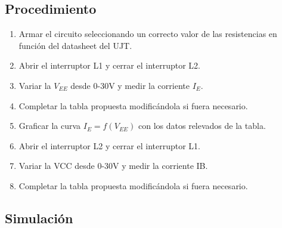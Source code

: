 \subsection{Procedimiento}
\begin{enumerate}
  \item Armar el circuito seleccionando un correcto valor de las resistencias en
    función del datasheet del UJT.
  \item Abrir el interruptor L1 y cerrar el interruptor L2.
  \item Variar la $V_{EE}$ desde 0-30V y medir la corriente $I_E$.
  \item Completar la tabla propuesta modificándola si fuera necesario.
  \item Graficar la curva $I_E= f(V_{EE})$ con los datos relevados de la tabla.
  \item Abrir el interruptor L2 y cerrar el interruptor L1.
  \item Variar la VCC desde 0-30V y medir la corriente IB.
  \item Completar la tabla propuesta modificándola si fuera necesario.
\end{enumerate}
\subsection{Simulación}
